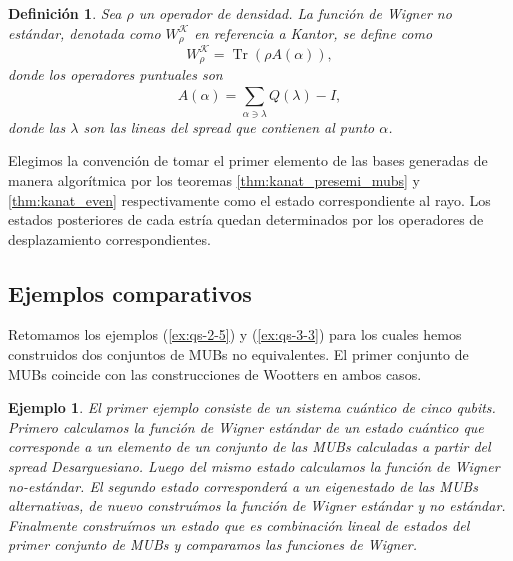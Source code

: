 \documentclass[a4paper]{report}
\DeclareMathOperator{\Tr}{Tr}
\newtheorem{definition}{Definición}
\newtheorem{example}{Ejemplo}
\begin{document}
  \begin{definition}
    Sea $\rho$ un operador de densidad. La función de Wigner
    no estándar, denotada como $W_\rho^{\mathcal K}$ en
    referencia a Kantor, se define como
    \begin{equation}
      W_\rho^{\mathcal K}
      = \Tr\left( \rho A(\alpha) \right),
    \end{equation}
    donde los operadores puntuales son
    \begin{equation}
      A(\alpha)
      = \sum_{\alpha \ni \lambda}^{} Q(\lambda) - I,
    \end{equation}
    donde las $\lambda$ son las lineas del spread que
    contienen al punto $\alpha$.
  \end{definition}

  Elegimos la convención de tomar el primer elemento de las
  bases generadas de manera algorítmica por los teoremas
  \ref{thm:kanat_presemi_mubs} y \ref{thm:kanat_even}
  respectivamente como el estado correspondiente al rayo.
  Los estados posteriores de cada estría quedan determinados
  por los operadores de desplazamiento correspondientes.

  \subsection{Ejemplos comparativos} 

  Retomamos los ejemplos (\ref{ex:qs-2-5}) y
  (\ref{ex:qs-3-3}) para los cuales hemos construidos dos
  conjuntos de MUBs no equivalentes. El primer conjunto de
  MUBs coincide con las construcciones de Wootters en ambos
  casos.

  \begin{example}
    El primer ejemplo consiste de un sistema cuántico de
    cinco qubits. Primero calculamos la función de Wigner
    estándar de un estado cuántico que corresponde a un
    elemento de un conjunto de las MUBs calculadas a partir
    del spread Desarguesiano. Luego del mismo estado
    calculamos la función de Wigner no-estándar. El segundo
    estado corresponderá a un eigenestado de las MUBs
    alternativas, de nuevo construímos la función de Wigner
    estándar y no estándar. Finalmente construímos un estado
    que es combinación lineal de estados del primer conjunto
    de MUBs y comparamos las funciones de Wigner.
  \end{example}
\end{document}
